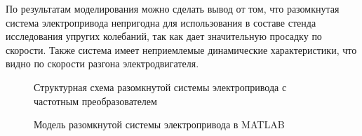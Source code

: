        По результатам моделирования можно сделать вывод от том, что
        разомкнутая система электропривода непригодна для использования в
        составе стенда исследования упругих колебаний, так как дает
        значительную просадку по скорости. Также система имеет неприемлемые
        динамические характеристики, что видно по скорости разгона
        электродвигателя.
        
        \begin{figure}[h!]
            \caption{Структурная схема разомкнутой системы электропривода с
                частотным преобразователем}
            \label{fig:struct-old}
        \end{figure}

        \begin{figure}
            \caption{Модель разомкнутой системы электропривода в MATLAB}
            \label{fig:open-loop-model}
        \end{figure}
        
